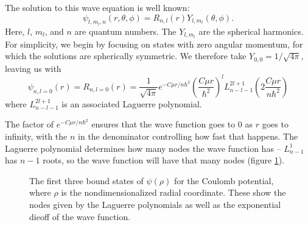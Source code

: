 \documentclass[12pt,twoside]{reedthesis}
\newcommand{\eqn}[1]{\begin{equation}#1\end{equation}}
\begin{document}
The solution to this wave equation is well known:
\eqn{
\psi_{l, m_l, n} (r, \theta, \phi) = R_{n,l}(r) Y_{l,m_l}(\theta,\phi)\mbox{.}
}
Here, $l$, $m_l$, and $n$ are quantum numbers. The $Y_{l, m_l}$ are the spherical harmonics. For simplicity, we begin by focusing on states with zero angular momentum, for which the solutions are spherically symmetric. We therefore take $Y_{0,0} = 1/\sqrt{4 \pi}$, leaving us with
\eqn{
\psi_{n, l =0}(r) = R_{n , l= 0}(r) = \frac{1}{\sqrt{4\pi}} e^{-C \mu r / n \hbar^2}\left(\frac{C \mu r}{\hbar^2}\right)^{l} L^{2l + 1 }_{n- l -1} \left(2\frac{C \mu r}{n \hbar^2}\right)
\label{eq:SWE-coulomb}
}
where $L^{2l+1}_{n-l-1}$ is an associated Laguerre polynomial. 

The factor of $e^{-C \mu r / n \hbar^2}$ ensures that the wave function goes to 0 as $r$ goes to infinity, with the $n$ in the denominator controlling how fast that happens. The Laguerre polynomial determines how many nodes the wave function has -- $L^1_{n-1}$ has $n-1$ roots, so the wave function will have that many nodes (figure \ref{fig:wavefunctions}).
\begin{figure}[h]
\centering
{}
\caption{The first three bound states of $\psi(\rho)$ for the Coulomb potential, where $\rho$ is the nondimensionalized radial coordinate. These show the nodes given by the Laguerre polynomials as well as the exponential dieoff of the wave function.}
\label{fig:wavefunctions}
\end{figure}
\end{document}
